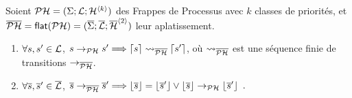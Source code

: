 \begin{theorem}[$\PH \approx \PHflat(\PH)$]
  Soient $\PH = (\PHs; \PHl; \PHa^{\angles{k}})$ des Frappes de Processus avec $k$
  classes de priorités,
  et $\oPH = \PHflat(\PH) = (\ov{\PHs}; \ov{\PHl}; \ov{\PHa}^{\angles{2}})$ leur aplatissement.
  \begin{enumerate}
    \item \label{php2ph} $\forall s, s' \in \PHl$,
      $s \trans{\PH} s' \Longrightarrow \flats{s} \mtrans{\oPH} \flats{s'}$,
      où $\mtrans{\oPH}$ est une séquence finie de transitions $\trans{\oPH}$.
    \item \label{ph2php} $\forall \os, \os' \in \ov{\PHl}$,
      $\os \trans{\oPH} \os' \Longrightarrow \unflats{\os} = \unflats{\os'} \vee
      \unflats{\os} \trans{\PH} \unflats{\os'} \enspace.$
  \end{enumerate}
\end{theorem}

